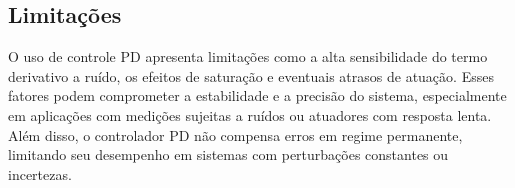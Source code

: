 \subsection{Limitações}
O uso de controle PD apresenta limitações como a alta sensibilidade do termo derivativo a ruído, os  efeitos de saturação e eventuais atrasos de atuação.
Esses fatores podem comprometer a estabilidade e a precisão do sistema, especialmente em aplicações com medições sujeitas a ruídos ou atuadores com resposta lenta.
Além disso, o controlador PD não compensa erros em regime permanente, limitando seu desempenho em sistemas com perturbações constantes ou incertezas.